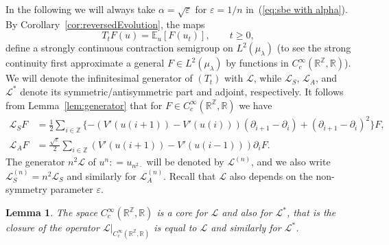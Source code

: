 \documentclass[11pt, a4paper]{article}
\newcommand{\cdummy}{\cdot}
\newtheorem{lemma}[theorem]{Lemma}
\newcommand{\CL}{\mathcal{L}}
\newcommand{\1}{\mathbf{1}}
\begin{document}
In the following we will always take $\alpha = \sqrt{\varepsilon}$ for
$\varepsilon = 1 / n$ in~(\ref{eq:sbe with alpha}). By
Corollary~\ref{cor:reversedEvolution}, the maps
\[ T_t F (u) =\mathbb{E}_u [F (u_t)], \hspace{2em} t \geqslant 0, \]
define a strongly continuous contraction semigroup on $L^2
({\mu}_{\lambda})$ (to see the strong continuity first approximate a
general $F \in L^2 ({\mu}_{\lambda})$ by functions in $C^{\infty}_c
(\mathbb{R}^{\mathbb{Z}}, \mathbb{R})$). We will denote the infinitesimal
generator of $(T_t)$ with $\CL$, while $\CL_S$, $\CL_A$, and $\CL^{\ast}$
denote its symmetric/antisymmetric part and adjoint, respectively. It follows
from Lemma~\ref{lem:generator} that for $F \in C^{\infty}_c
(\mathbb{R}^{\mathbb{Z}}, \mathbb{R})$ we have
 \begin{align*}
 \CL_S F &= \frac{1}{2} \sum_{i \in \mathbb{Z}} \{ - (V' (u (i + 1)) - V' (u
 (i))) (\partial_{i + 1} - \partial_i) + (\partial_{i + 1} - \partial_i)^2
 \} F, \\
 \CL_A F &= \frac{\sqrt{\varepsilon}}{2} \sum_{i \in \mathbb{Z}} (V' (u (i +
 1)) - V' (u (i - 1))) \partial_i F.
 \end{align*}
The generator $n^2 \CL$ of $u^n : = u_{n^2 \cdummy}$ will be denoted by
$\CL^{(n)}$, and we also write $\CL^{(n)}_S = n^2 \CL_S$ and similarly for
$\CL^{(n)}_A$. Recall that $\mathcal{L}$ also depends on the non-symmetry
parameter $\varepsilon$.

\begin{lemma}
  \label{lem:core}The space $C^{\infty}_c (\mathbb{R}^{\mathbb{Z}},
  \mathbb{R})$ is a core for $\CL$ and also for $\CL^{\ast}$, that is the
  closure of the operator $\CL |_{C^{\infty}_c (\mathbb{R}^{\mathbb{Z}},
  \mathbb{R})}$ is equal to $\CL$ and similarly for $\CL^{\ast}$.
\end{lemma}
\end{document}
